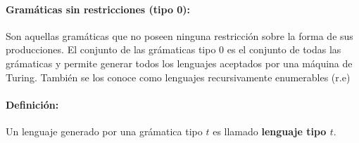 \paragraph{Gramáticas sin restricciones (tipo 0):} Son aquellas gramáticas que no poseen ninguna restricción sobre la forma de sus producciones. El conjunto de las grámaticas tipo 0 es el conjunto de todas las grámaticas y permite generar todos los lenguajes aceptados por una máquina de Turing. También se los conoce como lenguajes recursivamente enumerables (r.e)

\paragraph{Definición:} Un lenguaje generado por una grámatica tipo \(t\) es llamado \textbf{lenguaje tipo \(t\)}.